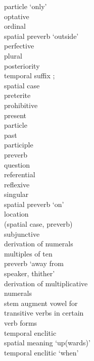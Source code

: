 \begin{multicols}{2}
\begin{tabbing}
				\>	particle `only'\\
				\>	optative\\
				\>	ordinal\\
				\>	spatial preverb `outside'\\
				\>	perfective\\
				\>	plural\\
				\>	posteriority \\
			{}		\>	    temporal suffix ;\\
			{}		\>	    spatial case  \\
				\>	preterite\\
				\>	prohibitive\\
				\>	present\\
				\>	particle\\
				\>	past\\
				\>	participle\\
				\>	preverb\\
					\>	question\\
				\>	referential\\
				\>	reflexive\\
				\>	singular\\
				\>	spatial preverb `on'\\
				\>	location \\
			{}		\>	(spatial case, preverb)\\
				\>	subjunctive\\
				\>	derivation of numerals \\ \> multiples of ten\\
				\>	preverb `away from \\ \> speaker, thither'\\
				\>	derivation of multiplicative \\ \> numerals\\
				\>	stem augment vowel for \\ \> transitive verbs in certain \\ \> verb forms\\
				\>	temporal enclitic\\
				\>	spatial meaning `up(wards)'\\
				\>	temporal enclitic `when'
		\end{tabbing}
	\end{multicols}

